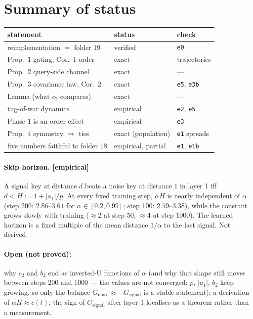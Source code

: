 \documentclass[11pt]{article}
\theoremstyle{definition}
\theoremstyle{remark}
\newcommand{\1}{\mathbf{1}}
\begin{document}
\section{Summary of status}
\begin{center}
\begin{tabular}{lll}
\toprule
statement & status & check \\ \midrule
reimplementation $=$ folder 19 & verified & \texttt{e0} \\
Prop.~1 gating, Cor.~1 order & exact & trajectories \\
Prop.~2 query-side channel & exact & --- \\
Prop.~3 covariance law, Cor.~2 & exact & \texttt{e5}, \texttt{e3b} \\
Lemma (what $c_2$ compares) & exact & --- \\
tug-of-war dynamics & empirical & \texttt{e2}, \texttt{e5} \\
Phase 1 is an order effect & empirical & \texttt{e3} \\
Prop.~4 symmetry $\Rightarrow$ ties & exact (population) & \texttt{e1} spreads \\
five numbers faithful to folder 18 & empirical, partial & \texttt{e1}, \texttt{e1b} \\
\bottomrule
\end{tabular}
\end{center}

\paragraph{Skip horizon. \textbf{[empirical]}} A signal key at distance $d$ beats a noise key at
distance $1$ in layer 1 iff $d<H:=1+|a_1|/p$. At every fixed training step, $\alpha H$ is nearly
independent of $\alpha$ (step 200: $2.86$--$3.61$ for $\alpha\in[0.2,0.99]$; step 100:
$2.59$--$3.38$), while the constant grows slowly with training ($\approx2$ at step 50,
$\approx4$ at step 1000). The learned horizon is a fixed multiple of the mean distance $1/\alpha$
to the last signal. Not derived.

\paragraph{Open (not proved):} why $c_2$ and $b_2$ end as inverted-U functions of $\alpha$
(and why that shape still moves between steps 200 and 1000 --- the values are not converged:
$p$, $|a_1|$, $b_2$ keep growing, so only the balance $G_{\mathrm{noise}}\approx-G_{\mathrm{signal}}$
is a stable statement); a derivation of $\alpha H\approx c(t)$; the sign of $G_{\mathrm{signal}}$
after layer 1 localises as a theorem rather than a measurement.
\end{document}
